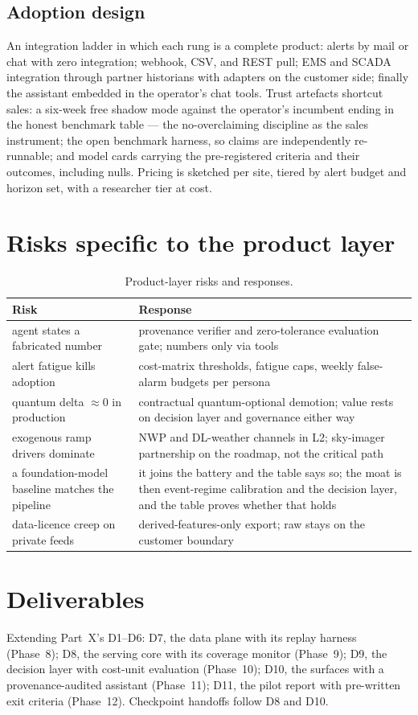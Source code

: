\subsection{Adoption design}
An integration ladder in which each rung is a complete product: alerts by
mail or chat with zero integration; webhook, CSV, and REST pull; EMS and
SCADA integration through partner historians with adapters on the customer
side; finally the assistant embedded in the operator's chat tools. Trust
artefacts shortcut sales: a six-week free shadow mode against the
operator's incumbent ending in the honest benchmark table --- the
no-overclaiming discipline as the sales instrument; the open benchmark
harness, so claims are independently re-runnable; and model cards carrying
the pre-registered criteria and their outcomes, including nulls. Pricing is
sketched per site, tiered by alert budget and horizon set, with a
researcher tier at cost.

\section{Risks specific to the product layer}
\label{sec:prod-risks}

\begin{table}[h]
\centering\small
\caption{Product-layer risks and responses.}
\label{tab:prod-risks}
\begin{tabular}{@{}p{5.4cm}p{8.6cm}@{}}
\toprule
Risk & Response \\
\midrule
agent states a fabricated number & provenance verifier and zero-tolerance evaluation gate; numbers only via tools \\
alert fatigue kills adoption & cost-matrix thresholds, fatigue caps, weekly false-alarm budgets per persona \\
quantum delta $\approx0$ in production & contractual quantum-optional demotion; value rests on decision layer and governance either way \\
exogenous ramp drivers dominate & NWP and DL-weather channels in L2; sky-imager partnership on the roadmap, not the critical path \\
a foundation-model baseline matches the pipeline & it joins the battery and the table says so; the moat is then event-regime calibration and the decision layer, and the table proves whether that holds \\
data-licence creep on private feeds & derived-features-only export; raw stays on the customer boundary \\
\bottomrule
\end{tabular}
\end{table}

\section{Deliverables}
\label{sec:prod-deliverables}

Extending Part~X's D1--D6: D7, the data plane with its replay harness
(Phase~8); D8, the serving core with its coverage monitor (Phase~9); D9,
the decision layer with cost-unit evaluation (Phase~10); D10, the surfaces
with a provenance-audited assistant (Phase~11); D11, the pilot report with
pre-written exit criteria (Phase~12). Checkpoint handoffs follow D8 and
D10.
